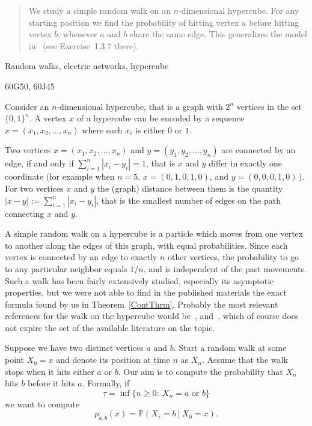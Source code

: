 \documentclass[12pt]{article}
\newenvironment{AMS}{}{}
\newenvironment{keywords}{}{}
\begin{document}
\newpage
\maketitle
\begin{abstract}
    We study a simple random walk on an $n$-dimensional hypercube.
    For any starting position we find the probability of hitting
    vertex $a$ before hitting vertex $b$, whenever $a$ and $b$ share the
    same edge. This generalizes the model in~\cite{DS} (see
    Exercise~1.3.7 there).
\end{abstract}

\begin{keywords}
   Random walks, electric networks, hypercube
\end{keywords}

\begin{AMS}
   60G50,  60J45
\end{AMS}

Consider an $n$-dimensional hypercube, that is a graph with $2^n$
vertices in the set $\{0,1\}^n$. A vertex $x$ of a hypercube can
be encoded by a sequence $x=(x_1,x_2,\dots,x_n)$ where each $x_i$
is either $0$ or $1$.

Two vertices $x=(x_1,x_2,\dots,x_n)$ and $y=(y_1,y_2,\dots,y_n)$
are connected by an edge, if and only if $\sum_{i=1}^n
|x_i-y_i|=1$, that is $x$ and $y$ differ in exactly one coordinate
(for example when $n=5$, $x=(0,1,0,1,0)$, and $y=(0,0,0,1,0)$\,).
For two vertices $x$ and $y$ the (graph) distance between them is
the quantity $|x-y|:=\sum_{i=1}^n |x_i-y_i|$, that is the smallest
number of edges on the path connecting $x$ and $y$.

A simple random walk on a hypercube is a particle which moves from
one vertex to another along the edges of this graph, with equal
probabilities. Since each vertex is connected by an edge to
exactly $n$ other vertices, the probability to go to any
particular neighbor equals $1/n$, and is independent of the past
movements. Such a walk has been fairly extensively studied,
especially its asymptotic properties, but we were not able to find
in the published materials the exact formula found by us in
Theorem~\ref{ContThrm}. Probably the most relevant references for
the walk on the hypercube would be~\cite{Diac}, \cite{DS}
and~\cite{Voit}, which of course does not expire the set of the
available literature on the topic.

Suppose we have two distinct vertices $a$ and $b$. Start a random
walk at some point $X_0=x$ and denote its position at time $n$
 as $X_n$. Assume that the walk stops when it hits
either $a$ or $b$. Our aim is to compute the probability that
$X_n$ hits $b$ before it hits $a$. Formally, if
$$
 \tau=\inf\{n\ge 0:\ X_n=a\mbox{ or }b\}
$$
we want to compute
$$
 p_{a,b}(x)={{\mathbb{P}}}(X_{\tau}=b \ |\ X_0=x).
$$
\end{document}
